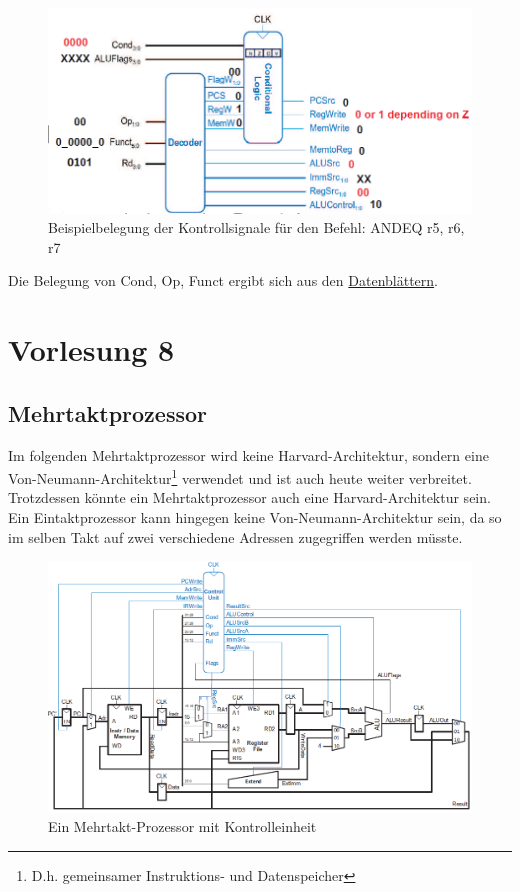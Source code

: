 \documentclass[a4paper,12pt,leqno]{article}
\begin{document}
\begin{figure}[h!]
\centering
\includegraphics[scale=0.6]{Grafiken/Eintakt-Kontrolleinheit_Belegung-ANDEQ.png}
\caption{Beispielbelegung der Kontrollsignale für den Befehl: ANDEQ r5, r6, r7}
\end{figure}
Die Belegung von Cond, Op, Funct ergibt sich aus den \href{http://www.heenes.de/ro/material/arm/arm-instructionset.pdf}{Datenblättern}.

\section{Vorlesung 8}
\subsection{Mehrtaktprozessor}

Im folgenden Mehrtaktprozessor wird keine Harvard-Architektur, sondern eine Von-Neumann-Architektur\footnote{D.h. gemeinsamer Instruktions- und Datenspeicher} verwendet und ist auch heute weiter verbreitet. Trotzdessen könnte ein Mehrtaktprozessor auch eine Harvard-Architektur sein.\\
Ein Eintaktprozessor kann hingegen keine Von-Neumann-Architektur sein, da so im selben Takt auf zwei verschiedene Adressen zugegriffen werden müsste.

\begin{figure}[h!]
\centering
\includegraphics[scale=0.6]{Grafiken/Mehrtakt.png}
\caption{Ein Mehrtakt-Prozessor mit Kontrolleinheit}
\end{figure}
\end{document}
